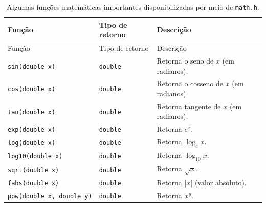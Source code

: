\documentclass[
  11pt,
  a4paper,
]{scrbook}
\begin{document}
\begin{longtable}[]{@{}
  >{\raggedright\arraybackslash}p{}
  >{\centering\arraybackslash}p{}
  >{\raggedright\arraybackslash}p{}@{}}
\caption{Algumas funções matemáticas importantes disponibilizadas por
meio de \texttt{math.h}.}\label{tbl-funcoes-math-h}\tabularnewline
\toprule\noalign{}
\begin{minipage}[b]{\linewidth}\raggedright
Função
\end{minipage} & \begin{minipage}[b]{\linewidth}\centering
Tipo de retorno
\end{minipage} & \begin{minipage}[b]{\linewidth}\raggedright
Descrição
\end{minipage} \\
\midrule\noalign{}
\endfirsthead
\toprule\noalign{}
\begin{minipage}[b]{\linewidth}\raggedright
Função
\end{minipage} & \begin{minipage}[b]{\linewidth}\centering
Tipo de retorno
\end{minipage} & \begin{minipage}[b]{\linewidth}\raggedright
Descrição
\end{minipage} \\
\midrule\noalign{}
\endhead
\bottomrule\noalign{}
\endlastfoot
\texttt{sin(double\ x)} & \texttt{double} & Retorna o seno de \(x\) (em
radianos). \\
\texttt{cos(double\ x)} & \texttt{double} & Retorna o cosseno de \(x\)
(em radianos). \\
\texttt{tan(double\ x)} & \texttt{double} & Retorna tangente de \(x\)
(em radianos). \\
\texttt{exp(double\ x)} & \texttt{double} & Retorna \(e^x\). \\
\texttt{log(double\ x)} & \texttt{double} & Retorna \(\log_e x\). \\
\texttt{log10(double\ x)} & \texttt{double} & Retorna
\(\log_{10} x\). \\
\texttt{sqrt(double\ x)} & \texttt{double} & Retorna \(\sqrt{x}\). \\
\texttt{fabs(double\ x)} & \texttt{double} & Retorna \(\lvert x \rvert\)
(valor absoluto). \\
\texttt{pow(double\ x,\ double\ y)} & \texttt{double} & Retorna
\(x^y\). \\
\end{longtable}
\end{document}
